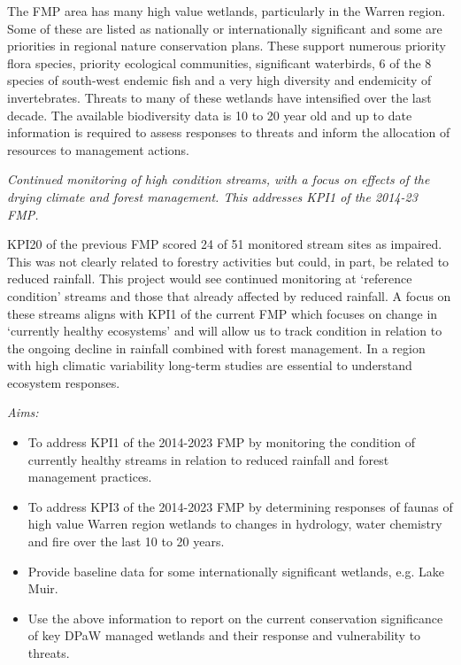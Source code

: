 \documentclass[version=last, paper=a4, DIV=18, usenames, dvipsnames]{scrartcl}
\begin{document}
The FMP area has many high value wetlands, particularly in the Warren
region. Some of these are listed as nationally or internationally
significant and some are priorities in regional nature conservation
plans. These support numerous priority flora species, priority
ecological communities, significant waterbirds, 6 of the 8 species of
south-west endemic fish and a very high diversity and endemicity of
invertebrates. Threats to many of these wetlands have intensified over
the last decade. The available biodiversity data is 10 to 20 year old
and up to date information is required to assess responses to threats
and inform the allocation of resources to management actions.

\emph{Continued monitoring of high condition streams, with a focus on
effects of the drying climate and forest management. This addresses KPI1
of the 2014-23 FMP.}

KPI20 of the previous FMP scored 24 of 51 monitored stream sites as
impaired. This was not clearly related to forestry activities but could,
in part, be related to reduced rainfall. This project would see
continued monitoring at `reference condition' streams and those that
already affected by reduced rainfall. A focus on these streams aligns
with KPI1 of the current FMP which focuses on change in `currently
healthy ecosystems' and will allow us to track condition in relation to
the ongoing decline in rainfall combined with forest management. In a
region with high climatic variability long-term studies are essential to
understand ecosystem responses.

\emph{Aims:}

\begin{itemize}
\item
  To address KPI1 of the 2014-2023 FMP by monitoring the condition of
  currently healthy streams in relation to reduced rainfall and forest
  management practices.
\item
  To address KPI3 of the 2014-2023 FMP by determining responses of
  faunas of high value Warren region wetlands to changes in hydrology,
  water chemistry and fire over the last 10 to 20 years.
\item
  Provide baseline data for some internationally significant wetlands,
  e.g. Lake Muir.
\item
  Use the above information to report on the current conservation
  significance of key DPaW managed wetlands and their response and
  vulnerability to threats.
\end{itemize}
\end{document}
